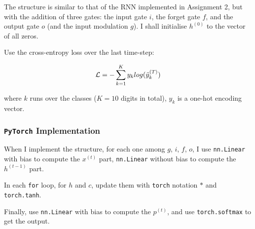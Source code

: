 The structure is similar to that of the RNN implemented in Assignment 2, but with the addition of three gates:
the input gate $i$, the forget gate $f$, and the output gate $o$ (and the input modulation $g$).
I shall initialise $h^{(0)}$ to the vector of all zeros.

Use the cross-entropy loss over the last time-step:

\begin{equation}
  \mathcal{L} = -\sum\limits_{k=1}^{K}y_{k}log(\Tilde{y}_{k}^{(T)})
\end{equation}

where $k$ runs over the classes ($K = 10$ digits in total), $y_k$ is a one-hot encoding vector.

\subsubsection{\texttt{PyTorch} Implementation}

When I implement the structure, for each one among $g$, $i$, $f$, $o$, I use \texttt{nn.Linear} with bias to compute the $x^{(t)}$ part, \texttt{nn.Linear} without bias to compute the $h^{(t-1)}$ part.

In each \texttt{for} loop, for $h$ and $c$, update them with \texttt{torch} notation $*$ and \texttt{torch.tanh}.

Finally, use \texttt{nn.Linear} with bias to compute the $p^{(t)}$, and use \texttt{torch.softmax} to get the output.
